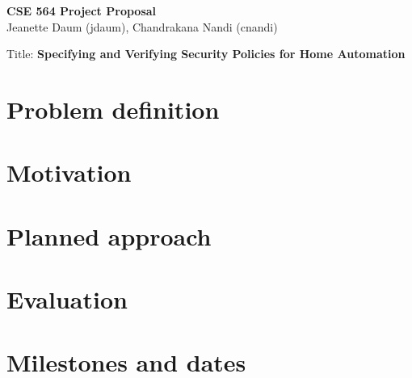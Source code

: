 \documentclass{article}
\begin{document}
\begin{center}
\LARGE\textbf {CSE 564 Project Proposal}\\
\large Jeanette Daum (jdaum), Chandrakana Nandi (cnandi)
\end{center}
\begin{center}
Title: \textbf{Specifying and Verifying Security Policies for Home Automation}
\end{center}

\section{Problem definition}
\section{Motivation}
\section{Planned approach}
\section{Evaluation}
\section{Milestones and dates}
\end{document}
